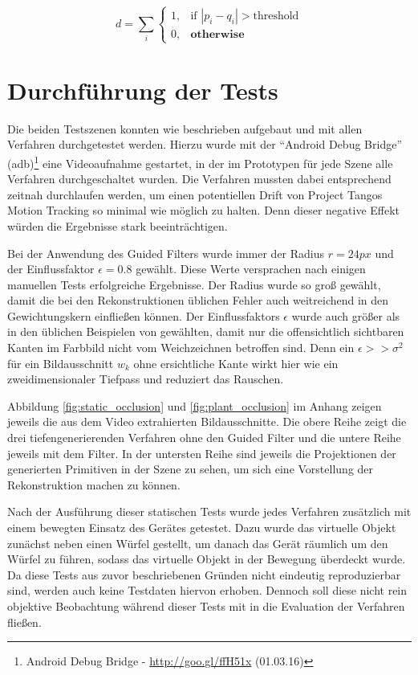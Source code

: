 \begin{equation} \label{eq:diff}
d = \sum_i 
	\begin{cases}
		1, & \text{if } | p_i - q_i | > \text{threshold} \\
		0, & \textbf{otherwise}
	\end{cases}
\end{equation}

\section{Durchführung der Tests}

Die beiden Testszenen konnten wie beschrieben aufgebaut und mit allen Verfahren durchgetestet werden. Hierzu wurde mit der \enquote{Android Debug Bridge} (adb)\footnote{Android Debug Bridge - \url{http://goo.gl/ffH51x} (01.03.16)} eine Videoaufnahme gestartet, in der im Prototypen für jede Szene alle Verfahren durchgeschaltet wurden. Die Verfahren mussten dabei entsprechend zeitnah durchlaufen werden, um einen potentiellen Drift von Project Tangos Motion Tracking so minimal wie möglich zu halten. Denn dieser negative Effekt würden die Ergebnisse stark beeinträchtigen. 

Bei der Anwendung des Guided Filters wurde immer der Radius \(r = 24px\) und der Einflussfaktor \(\epsilon = 0.8\) gewählt. Diese Werte versprachen nach einigen manuellen Tests erfolgreiche Ergebnisse. Der Radius wurde so groß gewählt, damit die bei den Rekonstruktionen üblichen Fehler auch weitreichend in den Gewichtungskern einfließen können. Der Einflussfaktors \(\epsilon\) wurde auch größer als in den üblichen Beispielen von \citep{he2010guided} gewählten, damit nur die offensichtlich sichtbaren Kanten im Farbbild nicht vom Weichzeichnen betroffen sind. Denn ein \(\epsilon >> \sigma^2 \) für ein Bildausschnitt \(w_k\) ohne ersichtliche Kante wirkt hier wie ein zweidimensionaler Tiefpass und reduziert das Rauschen.

Abbildung \ref{fig:static_occlusion} und \ref{fig:plant_occlusion} im Anhang zeigen jeweils die aus dem Video extrahierten Bildausschnitte. Die obere Reihe zeigt die drei tiefengenerierenden Verfahren ohne den Guided Filter und die untere Reihe jeweils mit dem Filter. In der untersten Reihe sind jeweils die Projektionen der generierten Primitiven in der Szene zu sehen, um sich eine Vorstellung der Rekonstruktion machen zu können.

Nach der Ausführung dieser statischen Tests wurde jedes Verfahren zusätzlich mit einem bewegten Einsatz des Gerätes getestet. Dazu wurde das virtuelle Objekt zunächst neben einen Würfel gestellt, um danach das Gerät räumlich um den Würfel zu führen, sodass das virtuelle Objekt in der Bewegung überdeckt wurde. Da diese Tests aus zuvor beschriebenen Gründen nicht eindeutig reproduzierbar sind, werden auch keine Testdaten hiervon erhoben. Dennoch soll diese nicht rein objektive Beobachtung während dieser Tests mit in die Evaluation der Verfahren fließen.


